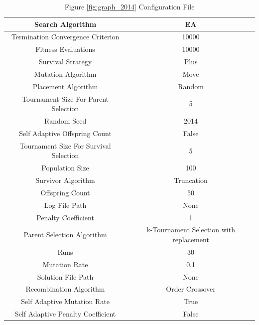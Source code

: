 \documentclass{standalone}
\begin{document}
\begin{table}[!htb]
	\centering
	\caption{Figure \ref{fig:graph_2014} Configuration File}
	\label{tab:graph_2014}
	\begin{tabular}{| c | c |}
		\hline
		Search Algorithm		& EA		 \\
		\hline
		Termination Convergence Criterion		& 10000		 \\
		\hline
		Fitness Evaluations		& 10000		 \\
		\hline
		Survival Strategy		& Plus		 \\
		\hline
		Mutation Algorithm		& Move		 \\
		\hline
		Placement Algorithm		& Random		 \\
		\hline
		Tournament Size For Parent Selection		& 5		 \\
		\hline
		Random Seed		& 2014		 \\
		\hline
		Self Adaptive Offspring Count		& False		 \\
		\hline
		Tournament Size For Survival Selection		& 5		 \\
		\hline
		Population Size		& 100		 \\
		\hline
		Survivor Algorithm		& Truncation		 \\
		\hline
		Offspring Count		& 50		 \\
		\hline
		Log File Path		& None		 \\
		\hline
		Penalty Coefficient		& 1		 \\
		\hline
		Parent Selection Algorithm		& k-Tournament Selection with replacement		 \\
		\hline
		Runs		& 30		 \\
		\hline
		Mutation Rate		& 0.1		 \\
		\hline
		Solution File Path		& None		 \\
		\hline
		Recombination Algorithm		& Order Crossover		 \\
		\hline
		Self Adaptive Mutation Rate		& True		 \\
		\hline
		Self Adaptive Penalty Coefficient		& False		 \\
		\hline
	\end{tabular}
\end{table}
\end{document}
